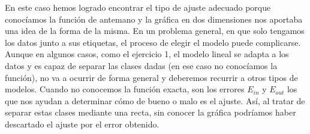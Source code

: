 \documentclass[a4paper, 20pt]{article}
\begin{document}
En este caso hemos logrado encontrar el tipo de ajuste adecuado porque conocíamos la función de antemano y la gráfica en dos dimensiones nos aportaba una idea de la forma de la misma. En un problema general, en que solo tengamos los datos junto a sus etiquetas, el proceso de elegir el modelo puede complicarse. Aunque en algunos casos, como el ejercicio 1, el modelo lineal se adapta a los datos y es capaz de separar las clases dadas (en ese caso no conocíamos la función), no va a ocurrir de forma general y deberemos recurrir a otros tipos de modelos. Cuando no conocemos la función exacta, son los errores $E_{in}$ y $E_{out}$ los que nos ayudan a determinar cómo de bueno o malo es el ajuste. Así, al tratar de separar estas clases mediante una recta, sin conocer la gráfica podríamos haber descartado el ajuste por el error obtenido.

\newpage
\printbibliography
\end{document}
